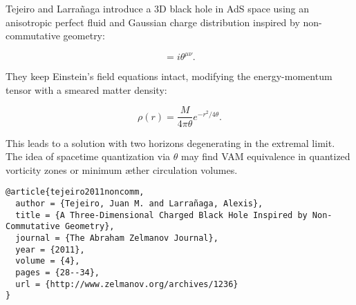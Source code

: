 Tejeiro and Larrañaga \cite{tejeiro2011noncomm} introduce a 3D black hole in AdS space using an anisotropic perfect fluid and Gaussian charge distribution inspired by non-commutative geometry:

\begin{equation}
[x^\mu, x^\nu] = i \theta^{\mu\nu}.
\end{equation}

They keep Einstein's field equations intact, modifying the energy-momentum tensor with a smeared matter density:

\begin{equation}
\rho(r) = \frac{M}{4\pi \theta} e^{-r^2/4\theta}.
\end{equation}

This leads to a solution with two horizons degenerating in the extremal limit. The idea of spacetime quantization via $\theta$ may find VAM equivalence in quantized vorticity zones or minimum æther circulation volumes.

\begin{verbatim}
@article{tejeiro2011noncomm,
  author = {Tejeiro, Juan M. and Larrañaga, Alexis},
  title = {A Three-Dimensional Charged Black Hole Inspired by Non-Commutative Geometry},
  journal = {The Abraham Zelmanov Journal},
  year = {2011},
  volume = {4},
  pages = {28--34},
  url = {http://www.zelmanov.org/archives/1236}
}
\end{verbatim}
